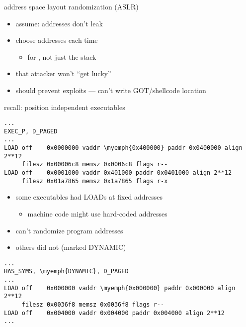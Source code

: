 
\begin{frame}{address space layout randomization (ASLR)}
    \begin{itemize}
    \item assume: addresses don't leak
    \item choose  addresses each time
        \begin{itemize}
        \item for , not just the stack
        \end{itemize}
    \item {} that attacker won't ``get lucky''
    \item should prevent exploits --- can't write GOT/shellcode location
    \end{itemize}
\end{frame}

\begin{frame}[fragile]{recall: position independent executables}
\begin{Verbatim}
...
EXEC_P, D_PAGED
...
LOAD off    0x0000000 vaddr \myemph{0x400000} paddr 0x0400000 align 2**12
     filesz 0x00006c8 memsz 0x0006c8 flags r--
LOAD off    0x0001000 vaddr 0x401000 paddr 0x0401000 align 2**12
     filesz 0x01a7865 memsz 0x1a7865 flags r-x
\end{Verbatim}
    \begin{itemize}
    \item some executables had LOADs at fixed addresses
        \begin{itemize}
        \item machine code might use hard-coded addresses
        \end{itemize}
    \item can't randomize program addresses
    \item others did not (marked DYNAMIC)
    \end{itemize}
\begin{Verbatim}[fontsize=\fontsize{9}{10}\selectfont,commandchars=\\\{\}]
...
HAS_SYMS, \myemph{DYNAMIC}, D_PAGED
...
LOAD off    0x000000 vaddr \myemph{0x000000} paddr 0x000000 align 2**12
     filesz 0x0036f8 memsz 0x0036f8 flags r--
LOAD off    0x004000 vaddr 0x004000 paddr 0x004000 align 2**12
...
\end{Verbatim}
\end{frame}
